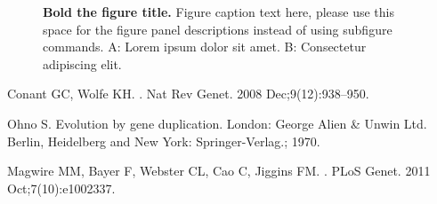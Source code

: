 \documentclass[10pt,letterpaper]{article}
\begin{document}
\begin{figure}[!h]
\caption{{\bf Bold the figure title.}
Figure caption text here, please use this space for the figure panel descriptions instead of using subfigure commands. A: Lorem ipsum dolor sit amet. B: Consectetur adipiscing elit.}
\label{fig1}
\end{figure}

\nolinenumbers

%
%
%
\begin{thebibliography}{10}

Conant GC, Wolfe KH.
.
\newblock Nat Rev Genet. 2008 Dec;9(12):938--950.

Ohno S.
\newblock Evolution by gene duplication.
\newblock London: George Alien \& Unwin Ltd. Berlin, Heidelberg and New York:
  Springer-Verlag.; 1970.

Magwire MM, Bayer F, Webster CL, Cao C, Jiggins FM.
.
\newblock PLoS Genet. 2011 Oct;7(10):e1002337.

\end{thebibliography}
\end{document}
